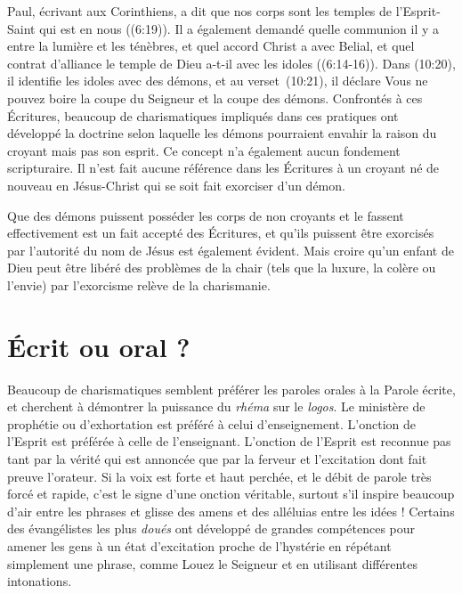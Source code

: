 Paul, écrivant aux Corinthiens, a dit que nos corps sont les temples
 de l'Esprit-Saint qui est en nous ((6:19)).
 Il a également demandé quelle communion il y a entre la lumière
 et les ténèbres, et quel accord Christ a avec Belial,
 et quel contrat d'alliance le temple de Dieu a-t-il avec les idoles
 ((6:14-16)). Dans (10:20),
 il identifie les idoles avec des démons, et au verset~(10:21),
 il déclare\frcolon{} \Og Vous ne pouvez boire la coupe du Seigneur
 et la coupe des démons. \Fg{} Confrontés à ces Écritures,
 beaucoup de charismatiques impliqués dans ces pratiques
 ont développé la doctrine selon laquelle les démons pourraient envahir
 la raison du croyant mais pas son esprit.
 Ce concept n'a également aucun fondement scripturaire.
 Il n'est fait aucune référence dans les Écritures à un croyant né de nouveau
 en Jésus-Christ qui se soit fait exorciser d'un démon.

Que des démons puissent posséder les corps de non croyants
 et le fassent effectivement est un fait accepté des Écritures,
 et qu'ils puissent être exorcisés par l'autorité du nom de Jésus
 est également évident. Mais croire qu'un enfant de Dieu peut être libéré
 des problèmes de la chair (tels que la luxure, la colère ou l'envie)
 par l'exorcisme relève de la charismanie.


\section{\'Ecrit ou oral ?}

Beaucoup de charismatiques semblent préférer les paroles orales
 à la Parole écrite, et cherchent à démontrer la puissance
 du \emph{rhéma} sur le \emph{logos}.
 Le ministère de prophétie ou d'exhortation
 est préféré à celui d'enseignement. L'onction de l'Esprit est préférée
 à celle de l'enseignant. L'onction de l'Esprit est reconnue
 pas tant par la vérité qui est annoncée que par la ferveur
 et l'excitation dont fait preuve l'orateur. Si la voix est forte
 et haut perchée, et le débit de parole très forcé et rapide,
 c'est le signe d'une onction véritable, surtout s'il inspire beaucoup
 d'air entre les phrases et glisse des amens et des alléluias
 entre les idées ! Certains des évangélistes les plus \emph{doués}
 ont développé de grandes compétences pour amener les gens
 à un état d'excitation proche de l'hystérie en répétant simplement
 une phrase, comme\frcolon{} \Og Louez le Seigneur \Fg{} et en utilisant différentes
 intonations.

